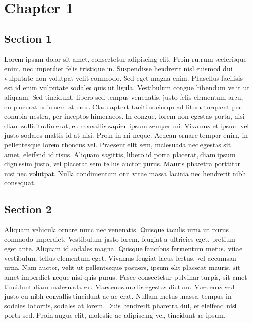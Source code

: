\documentclass[../thesis.tex]{subfiles}
\begin{document}
\chapter{Chapter 1}
\label{chap:chapter_1}

\section{Section 1}

Lorem ipsum dolor sit amet, consectetur adipiscing elit. Proin rutrum scelerisque enim, nec imperdiet felis tristique in. Suspendisse hendrerit nisl euismod dui vulputate non volutpat velit commodo. Sed eget magna enim. Phasellus facilisis est id enim vulputate sodales quis ut ligula. Vestibulum congue bibendum velit ut aliquam. Sed tincidunt, libero sed tempus venenatis, justo felis elementum arcu, eu placerat odio sem at eros. Class aptent taciti sociosqu ad litora torquent per conubia nostra, per inceptos himenaeos. In congue, lorem non egestas porta, nisi diam sollicitudin erat, eu convallis sapien ipsum semper mi. Vivamus et ipsum vel justo sodales mattis id at nisi. Proin in mi neque. Aenean ornare tempor enim, in pellentesque lorem rhoncus vel. Praesent elit sem, malesuada nec egestas sit amet, eleifend id risus. Aliquam sagittis, libero id porta placerat, diam ipsum dignissim justo, vel placerat sem tellus auctor purus. Mauris pharetra porttitor nisi nec volutpat. Nulla condimentum orci vitae massa lacinia nec hendrerit nibh consequat.

\section{Section 2}
Aliquam vehicula ornare nunc nec venenatis. Quisque iaculis urna ut purus commodo imperdiet. Vestibulum justo lorem, feugiat a ultricies eget, pretium eget ante. Aliquam id sodales magna. Quisque faucibus fermentum metus, vitae vestibulum tellus elementum eget. Vivamus feugiat lacus lectus, vel accumsan urna. Nam auctor, velit ut pellentesque posuere, ipsum elit placerat mauris, sit amet imperdiet neque nisi quis purus. Fusce consectetur pulvinar turpis, sit amet tincidunt diam malesuada eu. Maecenas mollis egestas dictum. Maecenas sed justo eu nibh convallis tincidunt ac ac erat. Nullam metus massa, tempus in sodales lobortis, sodales at lorem. Duis hendrerit pharetra dui, et eleifend nisl porta sed. Proin augue elit, molestie ac adipiscing vel, tincidunt ac ipsum.
\end{document}
